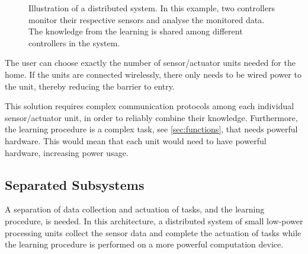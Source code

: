 \begin{figure}[htbp]
\centering
{}
\caption[Distributed system]{Illustration of a distributed system. In this example, two controllers monitor their respective sensors and analyse the monitored data. The knowledge from the learning is shared among different controllers in the system.}\label{fig:distributed_system}
\end{figure}

The user can choose exactly the number of sensor/actuator units needed for the home. If the units are connected wirelessly, there only needs to be wired power to the unit, thereby reducing the barrier to entry.

This solution requires complex communication protocols among each individual sensor/actuator unit, in order to reliably combine their knowledge. Furthermore, the learning procedure is a complex task, see \cref{sec:functions}, that needs powerful hardware. This would mean that each unit would need to have powerful hardware, increasing power usage.

\subsection{Separated Subsystems}
A separation of data collection and actuation of tasks, and the learning procedure, is needed. In this architecture, a distributed system of small low-power processing units collect the sensor data and complete the actuation of tasks while the learning procedure is performed on a more powerful computation device.

